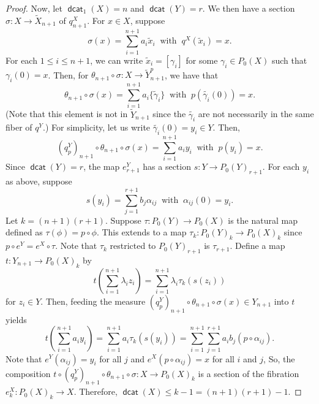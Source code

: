 \documentclass[10pt,a4paper]{amsart}
\theoremstyle{definition}
\newcommand{\Wi}{\widetilde}
\DeclareMathOperator{\dcat}{{\mathsf{dcat}}}
\begin{document}
\begin{proof}
Now, let $\dcat_1(X)=n$ and $\dcat(Y)=r$. We then have a section $\sigma\colon X\to \Wi X_{n+1}$ of $q^X_{n+1}$. For $x\in X$, suppose
    \[
    \sigma(x)=\sum_{i=1}^{n+1}a_i\Wi{x}_i \ \text{ with } \ q^X(\Wi{x}_i)=x.
    \]
    For each $1\le i \le n+1$, we can write $\Wi{x}_i=[\gamma_i]$ for some $\gamma_i\in P_0(X)$ 
such that $\gamma_i(0)=x$. Then, for $\theta_{n+1}\circ \sigma\colon X\to \Wi Y^p_{n+1}$, we have that
    \[
    \theta_{n+1}\circ \sigma(x) =\sum_{i=1}^{n+1}a_i\{\Wi{\gamma}_i\} \ \text{ with } \ p(\Wi{\gamma_i}(0))=x.
    \]
(Note that this element is not in $\Wi Y_{n+1}$ since the $\Wi{\gamma_i}$ are not
necessarily in the same fiber of $q^Y$.) 
For simplicity, let us write $\Wi{\gamma_i}(0)=y_i\in Y$. Then,
    \[
    (q^Y_p)_{n+1}\circ \theta_{n+1}\circ \sigma(x) =\sum_{i=1}^{n+1}a_iy_i \ \text{ with } \ p(y_i)=x.
    \]
    Since $\dcat(Y)=r$, the map $e^Y_{r+1}$ has a section $s\colon Y\to P_0(Y)_{r+1}$. 
For each $y_i$ as above, suppose
\[     
s(y_i)=\sum_{j=1}^{r+1}b_j\alpha_{ij} \ \text{ with } \ \alpha_{ij}(0)=y_i.       
\]
    Let $k=(n+1)(r+1)$. Suppose $\tau\colon P_0(Y)\to P_0(X)$ is the natural map defined 
as $\tau(\phi)=p\circ\phi$. This extends to a map $\tau_k\colon P_0(Y)_k \to P_0(X)_k$
since $p \circ e^Y = e^X \circ \tau$. Note that $\tau_k$ restricted to $P_0(Y)_{r+1}$
is $\tau_{r+1}$. Define a map $t\colon Y_{n+1}\to P_0(X)_k$ by
\[
t \left( \sum_{i=1}^{n+1}\lambda_iz_i \right) = \sum_{i=1}^{n+1}\lambda_i \tau_k\left(s(z_i)\right)
\]
for $z_i\in Y$. Then, feeding the measure $(q^Y_p)_{n+1}\circ \theta_{n+1}\circ \sigma(x) \in Y_{n+1}$ into $t$ yields
\[
t \left( \sum_{i=1}^{n+1}a_iy_i \right) = \sum_{i=1}^{n+1}a_i \tau_k\left(s(y_i)\right) = \sum_{i=1}^{n+1}\sum_{j=1}^{r+1}a_ib_j\left(p\circ\alpha_{ij}\right).
\]
Note that $e^Y(\alpha_{ij})=y_i$ for all $j$ and $e^X(p\circ\alpha_{ij})=x$ for all $i$ and $j$, So, the composition $t\circ (q^Y_p)_{n+1}\circ \theta_{n+1}\circ \sigma\colon X\to P_0(X)_k$ is a section of the fibration $e_k^X\colon P_0(X)_k\to X$. Therefore, $\dcat(X) \leq k-1 = (n+1)(r+1)-1$.
\end{proof}
\end{document}
